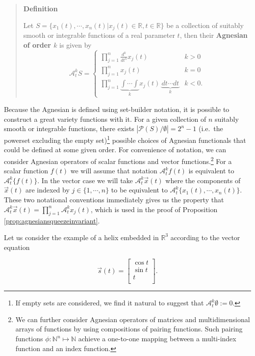 \documentclass[
  letterpaper,
  DIV=11,
  numbers=noendperiod]{scrreprt}
\begin{document}
\begin{quote}
\textbf{Definition}

Let
\(S = \{x_1(t),  \cdots, x_n(t) | x_j(t) \in \mathbb{R}, t \in \mathbb{R} \}\)
be a collection of suitably smooth or integrable functions of a real
parameter \(t\), then their \textbf{Agnesian of order \(k\)} is given by
\[\mathcal{A}_{t}^{k} S= \begin{cases} \prod_{j=1}^{n} \frac{d^k}{dt^k}x_j(t) & k > 0 \\ \prod_{j=1}^{n} x_j (t) & k = 0 \\ \prod_{j=1}^{n} \underbrace{\int \cdots \int}_k x_j(t)\ \underbrace{dt \cdots dt}_k & k < 0. \end{cases}\]
\end{quote}

Because the Agnesian is defined using set-builder notation, it is
possible to construct a great variety functions with it. For a given
collection of \(n\) suitably smooth or integrable functions, there
exists \(|\mathcal{P}(S)/\emptyset| = 2^n-1\) (i.e.~the powerset
excluding the empty
set)\footnote{If empty sets are considered, we find it natural to suggest that $\mathcal{A}_{t}^{k} \emptyset := 0$.}
possible choices of Agnesian functionals that could be defined at some
given order. For convenience of notation, we can consider Agnesian
operators of scalar functions and vector
functions.\footnote{We can further consider Agnesian operators of matrices and multidimensional arrays of functions by using compositions of pairing functions. Such pairing functions $\phi : \mathbb{N}^n \mapsto \mathbb{N}$ achieve a one-to-one mapping between a multi-index function and an index function.}
For a scalar function \(f(t)\) we will assume that notation
\(\mathcal{A}_t^k f(t)\) is equivalent to
\(\mathcal{A}_t^k \{ f(t) \}\). In the vector case we will take
\(\mathcal{A}_t^k \vec{x}(t)\) where the components of \(\vec{x}(t)\)
are indexed by \(j \in \{1, \cdots, n \}\) to be equivalent to
\(\mathcal{A}_t^k \{x_1(t), \cdots, x_n(t) \}\). These two notational
conventions immediately gives us the property that
\(\mathcal{A}_t^k \vec{x}(t) = \prod_{j=1}^n \mathcal{A}_t^k x_j(t)\),
which is used in the proof of Proposition
\ref{prop:agnesiansqueezeinvariant}.

Let us consider the example of a helix embedded in \(\mathbb{R}^3\)
according to the vector equation

\[\vec{s}(t) = \begin{bmatrix}
\cos t \\
\sin t \\
t \\
\end{bmatrix}.\]
\end{document}

